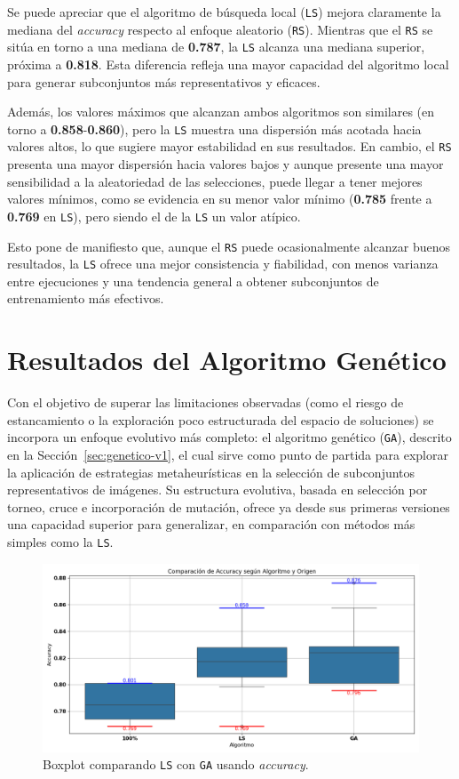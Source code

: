 Se puede apreciar que el algoritmo de búsqueda local (\texttt{LS}) mejora claramente la mediana del \textit{accuracy} respecto al enfoque aleatorio (\texttt{RS}).
Mientras que el \texttt{RS} se sitúa en torno a una mediana de \textbf{0.787}, la \texttt{LS} alcanza una mediana superior, próxima a \textbf{0.818}.
Esta diferencia refleja una mayor capacidad del algoritmo local para generar subconjuntos más representativos y eficaces.

Además, los valores máximos que alcanzan ambos algoritmos son similares (en torno a \textbf{0.858}-\textbf{0.860}),
pero la \texttt{LS} muestra una dispersión más acotada hacia valores altos, lo que sugiere mayor estabilidad en sus resultados.
En cambio, el \texttt{RS} presenta una mayor dispersión hacia valores bajos y aunque presente una mayor sensibilidad a la aleatoriedad de las selecciones,
puede llegar a tener mejores valores mínimos, como se evidencia en su menor valor mínimo (\textbf{0.785} frente a \textbf{0.769} en \texttt{LS}),
pero siendo el de la \texttt{LS} un valor atípico.

Esto pone de manifiesto que, aunque el \texttt{RS} puede ocasionalmente alcanzar buenos resultados,
la \texttt{LS} ofrece una mejor consistencia y fiabilidad, con menos varianza entre ejecuciones y una tendencia general a obtener subconjuntos de entrenamiento más efectivos.


\section{Resultados del Algoritmo Genético}\label{sec:resultados-algoritmo-genetico}
Con el objetivo de superar las limitaciones observadas (como el riesgo de estancamiento o la exploración poco estructurada del espacio de soluciones)
se incorpora un enfoque evolutivo más completo: el algoritmo genético (\texttt{GA}), descrito en la Sección~\ref{sec:genetico-v1}, el cual sirve como punto de partida para explorar la
aplicación de estrategias metaheurísticas en la selección de subconjuntos representativos de imágenes.
Su estructura evolutiva, basada en selección por torneo, cruce e incorporación de mutación,
ofrece ya desde sus primeras versiones una capacidad superior para generalizar, en comparación con métodos más simples como la \texttt{LS}.

\begin{figure}[htp]
  \centering
  \includegraphics[width=1\textwidth]{imagenes/evaluaciones/comparacion_ls-ga.png}
  \caption{Boxplot comparando \texttt{LS} con \texttt{GA} usando \textit{accuracy}.}
  \label{fig:lr-vs-gen-v1}
\end{figure}

